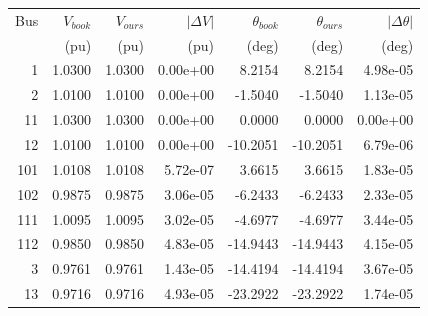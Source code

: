 \begin{tabular}{rrrrrrr}\toprule
{Bus} & {$V_{book}$} & {$V_{ours}$} & {$|\Delta V|$} & {$\theta_{book}$} & {$\theta_{ours}$} & {$|\Delta\theta|$}\\
{} & {(pu)} & {(pu)} & {(pu)} & {(deg)} & {(deg)} & {(deg)}\\ \midrule
1 & 1.0300 & 1.0300 & 0.00e+00 & 8.2154 & 8.2154 & 4.98e-05\\
2 & 1.0100 & 1.0100 & 0.00e+00 & -1.5040 & -1.5040 & 1.13e-05\\
11 & 1.0300 & 1.0300 & 0.00e+00 & 0.0000 & 0.0000 & 0.00e+00\\
12 & 1.0100 & 1.0100 & 0.00e+00 & -10.2051 & -10.2051 & 6.79e-06\\
101 & 1.0108 & 1.0108 & 5.72e-07 & 3.6615 & 3.6615 & 1.83e-05\\
102 & 0.9875 & 0.9875 & 3.06e-05 & -6.2433 & -6.2433 & 2.33e-05\\
111 & 1.0095 & 1.0095 & 3.02e-05 & -4.6977 & -4.6977 & 3.44e-05\\
112 & 0.9850 & 0.9850 & 4.83e-05 & -14.9443 & -14.9443 & 4.15e-05\\
3 & 0.9761 & 0.9761 & 1.43e-05 & -14.4194 & -14.4194 & 3.67e-05\\
13 & 0.9716 & 0.9716 & 4.93e-05 & -23.2922 & -23.2922 & 1.74e-05\\
\bottomrule\end{tabular}
